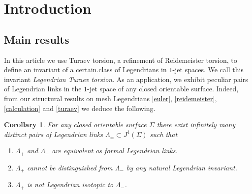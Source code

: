 \documentclass[11pt]{article}
\numberwithin{equation}{section}\providecommand{\dpl}{\displaystyle}
\newenvironment{enumeratea}
{\bgroup\def\theenumi{\alph{enumi}}\begin{enumerate}}
{\end{enumerate}\egroup}
\theoremstyle{plain}
\newtheorem{corollary}[theorem]{Corollary}
\theoremstyle{definition}
\begin{document}
\section{Introduction}\label{Section: introduction}

\subsection{Main results}\label{Subsection: main results}

In this article we use Turaev torsion, a refinement of Reidemeister torsion, to define an invariant of a certain.class of Legendrians in $1$-jet spaces. We call this invariant {\it Legendrian Turaev torsion}. As an application, we \hbox{exhibit} \hbox{peculiar} pairs of Legendrian links in the $1$-jet space of any closed orientable surface. Indeed, from our structural results on mesh Legendrians \ref{euler}, \ref{reidemeister}, \ref{calculation} and \ref{turaev} we deduce the following.

\begin{corollary}\label{corollarypairs}
For any closed orientable surface $\Sigma$ there exist infinitely many distinct pairs of Legendrian links $\Lambda_\pm \subset J^1(\Sigma)$ such that
\begin{enumeratea}
\item\label{corollarypairsa}
$\Lambda_+$ and $\Lambda_-$ are equivalent as formal Legendrian links.
\item\label{corollarypairsb}
$\Lambda_+$ cannot be distinguished from $\Lambda_-$ by any natural Legendrian invariant.
\item\label{corollarypairsc}
$\Lambda_+$ is not Legendrian isotopic to $\Lambda_-$.
\end{enumeratea}
\end{corollary}
\end{document}
